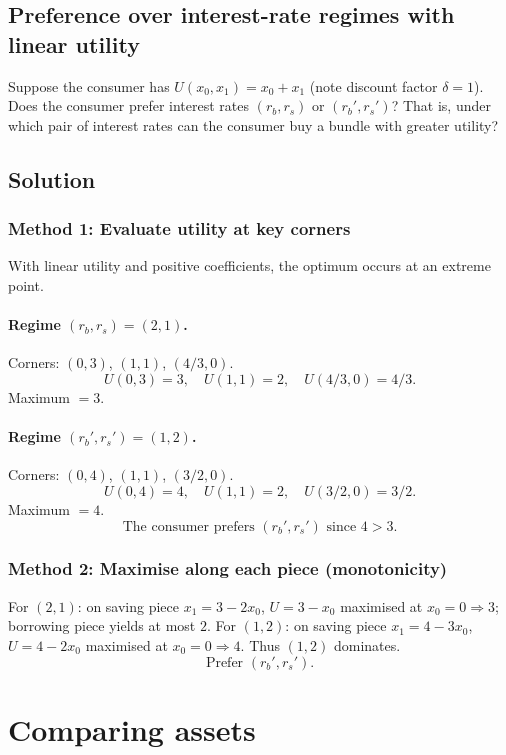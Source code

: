 \documentclass[12pt]{article}
\begin{document}
\subsection{Preference over interest-rate regimes with linear utility}
Suppose the consumer has \(U(x_0,x_1)=x_0+x_1\) (note discount factor \(\delta=1\)). Does the
consumer prefer interest rates \((r_b,r_s)\) or \((r_b',r_s')\)? That is, under which pair of interest
rates can the consumer buy a bundle with greater utility?

\subsection*{Solution}
\subsubsection*{Method 1: Evaluate utility at key corners}
With linear utility and positive coefficients, the optimum occurs at an extreme point.

\paragraph{Regime \((r_b,r_s)=(2,1)\).}
Corners: \((0,3)\), \((1,1)\), \((4/3,0)\).
\[
U(0,3)=3,\quad U(1,1)=2,\quad U(4/3,0)=4/3.
\]
Maximum \(=3\).

\paragraph{Regime \((r_b',r_s')=(1,2)\).}
Corners: \((0,4)\), \((1,1)\), \((3/2,0)\).
\[
U(0,4)=4,\quad U(1,1)=2,\quad U(3/2,0)=3/2.
\]
Maximum \(=4\).
\[
\boxed{\;\text{The consumer prefers }(r_b',r_s')\text{ since }4>3.\;}
\]

\subsubsection*{Method 2: Maximise along each piece (monotonicity)}
For \((2,1)\): on saving piece \(x_1=3-2x_0\), \(U=3-x_0\) maximised at \(x_0=0\Rightarrow 3\); borrowing piece yields at most \(2\).  
For \((1,2)\): on saving piece \(x_1=4-3x_0\), \(U=4-2x_0\) maximised at \(x_0=0\Rightarrow 4\).  
Thus \((1,2)\) dominates.
\[
\boxed{\;\text{Prefer }(r_b',r_s').\;}
\]

\newpage
\section{Comparing assets}
\end{document}
